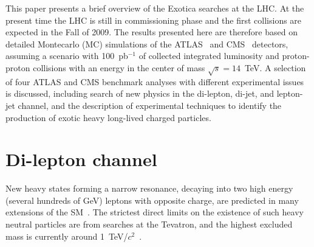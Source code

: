 \documentclass{cimento}
\begin{document}
This paper presents a brief overview of the Exotica searches at the LHC. 
At the present time the LHC is still in commissioning phase 
and the first collisions are expected in the Fall of 2009.
The results presented here are therefore based on detailed 
Montecarlo (MC) simulations of the ATLAS~\cite{Aad:2009wy} and 
CMS~\cite{Bayatian:2006zz,Ball:2007zza} detectors, assuming a scenario with 100~pb$^{-1}$ 
of collected integrated luminosity and proton-proton collisions 
with an energy in the center of mass $\sqrt{s} = 14$~TeV. 
A selection of four ATLAS and CMS benchmark analyses with different 
experimental issues is discussed, including 
search of new physics in the di-lepton, di-jet, and lepton-jet
channel, and the description of experimental techniques to identify the production of 
exotic heavy long-lived charged particles.


\section{Di-lepton channel} \label{dilepton}

New heavy states forming a narrow resonance, decaying 
into two high energy (several hundreds of GeV) 
leptons with opposite charge, are predicted in  
many extensions of the 
SM~\cite{Georgi:1974sy,ArkaniHamed:2001nc,Randall:1999ee,Lane:1999uh}.
The strictest direct limits on the existence of such 
heavy neutral particles are from searches at the Tevatron, and 
the highest excluded mass is currently around 
1~TeV/$c^2$~\cite{Aaltonen:2008vx,Aaltonen:2008ah,Abazov:2007ra}.
\end{document}
